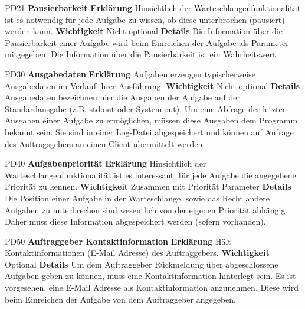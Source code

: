 \documentclass[a4paper,12pt]{article}
\begin{document}
\begin{itemize}[nosep]
\begin{minipage}[t]{\linewidth}
\item[PD21] \textbf{Pausierbarkeit}
\subitem \textbf{Erklärung} Hinsichtlich der Warteschlangenfunktionalität ist es notwendig für jede Aufgabe zu wissen, ob diese unterbrochen (pausiert) werden kann.
\subitem \textbf{Wichtigkeit} Nicht optional
\subitem \textbf{Details} Die Information über die Pausierbarkeit einer Aufgabe wird beim Einreichen der Aufgabe als Parameter mitgegeben.\newline
Die Information über die Pausierbarkeit ist ein Wahrheitswert.
\end{minipage}
\pagebreak

\begin{minipage}[t]{\linewidth}
\item[PD30] \textbf{Ausgabedaten}
\subitem \textbf{Erklärung} Aufgaben erzeugen typischerweise Ausgabedaten im Verlauf ihrer Ausführung.
\subitem \textbf{Wichtigkeit} Nicht optional
\subitem \textbf{Details} Ausgabedaten bezeichnen hier die Ausgaben der Aufgabe auf der Standardausgabe (z.B. std:out oder System.out).\newline
Um eine Abfrage der letzten Ausgaben einer Aufgabe zu ermöglichen, müssen diese Ausgaben dem Programm bekannt sein. Sie sind in einer Log-Datei abgespeichert und können auf Anfrage des Auftragsgebers an einen Client übermittelt werden.
\end{minipage}
\pagebreak

\begin{minipage}[t]{\linewidth}
\item[PD40] \textbf{Aufgabenpriorität}
\subitem \textbf{Erklärung} Hinsichtlich der Warteschlangenfunktionalität ist es interessant, für jede Aufgabe die angegebene Priorität zu kennen.
\subitem \textbf{Wichtigkeit} Zusammen mit Priorität Parameter
\subitem \textbf{Details} Die Position einer Aufgabe in der Warteschlange, sowie das Recht andere Aufgaben zu unterbrechen sind wesentlich von der eigenen Priorität abhängig. Daher muss diese Information abgespeichert werden (sofern vorhanden).
\end{minipage}
\pagebreak

\begin{minipage}[t]{\linewidth}
\item[PD50] \textbf{Auftraggeber Kontaktinformation}
\subitem \textbf{Erklärung} Hält Kontaktinformationen (E-Mail Adresse) des Auftraggebers.
\subitem \textbf{Wichtigkeit} Optional
\subitem \textbf{Details} Um dem Auftraggeber Rückmeldung über abgeschlossene Aufgaben geben zu können, muss eine Kontaktinformation hinterlegt sein.\newline
Es ist vorgesehen, eine E-Mail Adresse als Kontaktinformation anzunehmen. Diese wird beim Einreichen der Aufgabe von dem Auftraggeber angegeben.
\end{minipage}
\pagebreak


\end{itemize}
\end{document}
